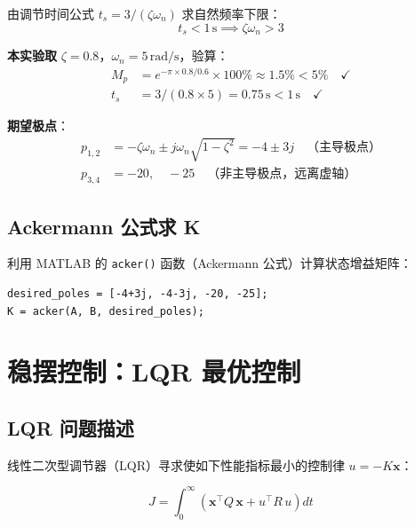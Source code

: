 \documentclass[12pt, a4paper]{article}
\begin{document}
由调节时间公式 $t_s = 3/(\zeta\omega_n)$ 求自然频率下限：
\begin{equation}
    t_s < 1\,\text{s} \implies \zeta\omega_n > 3
\end{equation}

\textbf{本实验取} $\zeta = 0.8$，$\omega_n = 5\,\text{rad/s}$，验算：
\begin{align}
    M_p &= e^{-\pi \times 0.8/0.6} \times 100\% \approx 1.5\% < 5\% \quad\checkmark \\
    t_s &= 3/(0.8 \times 5) = 0.75\,\text{s} < 1\,\text{s} \quad\checkmark
\end{align}

\textbf{期望极点}：
\begin{align}
    p_{1,2} &= -\zeta\omega_n \pm j\omega_n\sqrt{1-\zeta^2} = -4 \pm 3j \quad \text{（主导极点）}\\
    p_{3,4} &= -20,\quad -25 \quad \text{（非主导极点，远离虚轴）}
\end{align}

\subsection{Ackermann 公式求 K}

利用 MATLAB 的 \texttt{acker()} 函数（Ackermann 公式）计算状态增益矩阵：

\begin{lstlisting}[style=matlab, caption={极点配置核心代码}]
desired_poles = [-4+3j, -4-3j, -20, -25];
K = acker(A, B, desired_poles);
\end{lstlisting}

\section{稳摆控制：LQR 最优控制}

\subsection{LQR 问题描述}

线性二次型调节器（LQR）寻求使如下性能指标最小的控制律 $u = -K\bm{x}$：

\begin{equation}
    J = \int_0^\infty \left( \bm{x}^\top Q\,\bm{x} + u^\top R\,u \right) dt
    \label{eq:lqr_cost}
\end{equation}
\end{document}
